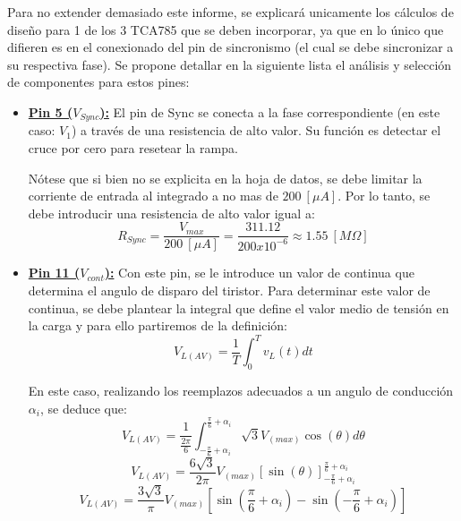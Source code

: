 \documentclass[12pt,a4paper]{article}
\begin{document}
Para no extender demasiado este informe, se explicará unicamente los cálculos de diseño para 1 de los 3 TCA785 que se deben incorporar, ya que en lo único que difieren es en el conexionado del pin de sincronismo (el cual se debe sincronizar a su respectiva fase). Se propone detallar en la siguiente lista el análisis y selección de componentes para estos pines:
\begin{itemize}
    \item \textbf{\underline{Pin 5 ($V_{Sync}$):}} El pin de Sync se conecta a la fase correspondiente (en este caso: $V_1$) a través de una resistencia de alto valor. Su función es detectar el cruce por cero para resetear la rampa. 
    
    Nótese que si bien no se explicita en la hoja de datos, se debe limitar la corriente de entrada al integrado a no mas de $200 \ [\mu A]$. Por lo tanto, se debe introducir una resistencia de alto valor igual a:
    \begin{equation}
        R_{Sync} = \frac{V_{max}}{200 \ [\mu A]} = \frac{311.12}{200x10^{-6}} \approx 1.55 \ [M\Omega]
        \label{eq_7}
    \end{equation}
    

    \item \textbf{\underline{Pin 11 ($V_{cont}$):}} Con este pin, se le introduce un valor de continua que determina el angulo de disparo del tiristor. Para determinar este valor de continua, se debe plantear la integral que define el valor medio de tensión en la carga y para ello partiremos de la definición:
    \begin{equation}
        V_{L(AV)} = \frac{1}{T} \int_{0}^{T} v_{L}(t) dt
        \label{eq_8}
    \end{equation}
    
    En este caso, realizando los reemplazos adecuados a un angulo de conducción $\alpha_{i}$, se deduce que:
    \begin{equation}
        V_{L(AV)} = \frac{1}{\frac{2\pi}{6}} \int_{-\frac{\pi}{6} + \alpha_{i}}^{\frac{\pi}{6} + \alpha_{i}} \sqrt{3} V_{(max)} \cos(\theta) d\theta
        \label{eq_9}
    \end{equation}
    \begin{equation}
        V_{L(AV)} = \frac{6\sqrt{3}}{2\pi} V_{(max)} \left[\sin(\theta)\right]_{-\frac{\pi}{6} + \alpha_{i}}^{\frac{\pi}{6} + \alpha_{i}}
        \label{eq_10}
    \end{equation}
    \begin{equation}
        V_{L(AV)} = \frac{3\sqrt{3}}{\pi} V_{(max)} \left[\sin(\frac{\pi}{6} + \alpha_{i}) - \sin(-\frac{\pi}{6} + \alpha_{i})\right]
        \label{eq_11}
    \end{equation}
    

\end{itemize}
\end{document}
